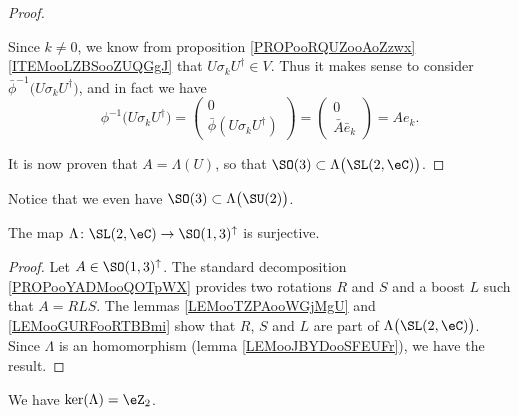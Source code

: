 \begin{proof}
\begin{subproof}
\begin{equation}
		\end{equation}
		Since \( k\neq 0\), we know from proposition \ref{PROPooRQUZooAoZzwx}\ref{ITEMooLZBSooZUQGgJ} that \( U\sigma_k U^{\dag}\in V\). Thus it makes sense to consider \( \bar \phi^{-1}\big(U\sigma_k U^{\dag}\big)\), and in fact we have
		\begin{equation}
			\phi^{-1}\big( U\sigma_k U^{\dag} \big)=\begin{pmatrix}
				0 \\
				\bar\phi(U\sigma_kU^{\dag})
			\end{pmatrix}=\begin{pmatrix}
				0 \\
				\bar A\bar e_k
			\end{pmatrix}=Ae_k.
		\end{equation}
	\end{subproof}
	It is now proven that \( A=\Lambda(U)\), so that \( \SO(3)\subset \Lambda\big( \SL(2,\eC) \big)\).
\end{proof}
Notice that we even have \( \SO(3)\subset \Lambda\big( \SU(2) \big)\).

\begin{proposition}     \label{PROPooFPSLooSzvSYF}
	The map \( \Lambda\colon \SL(2,\eC)\to \SO(1,3)^{\uparrow}\) is surjective.
\end{proposition}

\begin{proof}
	Let \( A\in \SO(1,3)^{\uparrow}\). The standard decomposition \ref{PROPooYADMooQOTpWX} provides two rotations \( R\) and \( S\) and a boost \( L\) such that \( A=RLS\). The lemmas \ref{LEMooTZPAooWGjMgU} and \ref{LEMooGURFooRTBBmi} show that \( R\), \( S\) and \( L\) are part of \( \Lambda\big( \SL(2,\eC) \big)\). Since \( \Lambda\) is an homomorphism (lemma \ref{LEMooJBYDooSFEUFr}), we have the result.
\end{proof}

\begin{lemma}       \label{LEMooQKCQooTIaesa}
	We have \( \ker(\Lambda)=\eZ_2\).
\end{lemma}

